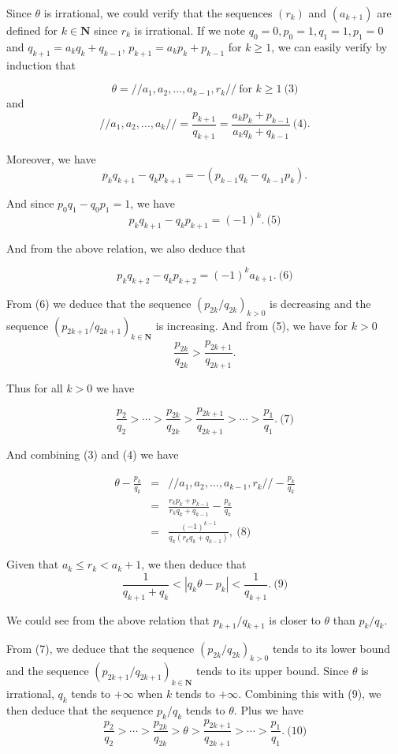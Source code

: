 \documentclass[a4paper,12pt]{article}
\begin{document}
Since $\theta$ is irrational, we could verify that the sequences
$(r_k)$ and $(a_{k+1})$ are defined for $k \in \textbf{N}$ since $r_k$
is irrational.  If we note $q_0 = 0, p_0 = 1, q_1 = 1, p_1 = 0$ and
$q_{k+1} = a_k q_k + q_{k-1}$, $p_{k+1} = a_k p_k + p_{k-1}$ for $k\ge
1$, we can easily verify by induction that

\[ \theta = //a_1,a_2,\ldots,a_{k-1},r_k //\ \mbox{for $k\ge 1$}\ \mbox{(3)}\]
and
\[ //a_1, a_2, \ldots, a_k // = \frac{p_{k+1}}{q_{k+1}} = \frac{a_k
  p_k + p_{k-1}}{a_k q_k + q_{k-1}}\ \mbox{(4)}.\]

Moreover, we have
\[p_k q_{k+1} - q_k p_{k+1} = - (p_{k-1}q_k - q_{k-1}p_k).\]

And since $p_0 q_1 - q_0 p_1 = 1$, we have
\[ p_k q_{k+1} - q_k p_{k+1} = (-1)^k.\ \mbox{(5)}\]

And from the above relation, we also deduce that

\[ p_kq_{k+2} - q_k p_{k+2} = (-1)^ka_{k+1}.\ \mbox{(6)}\]

From (6) we deduce that the sequence $(p_{2k}/q_{2k})_{k>0}$ is
decreasing and the sequence $(p_{2k+1}/q_{2k+1})_{k \in \textbf{N}}$ is
increasing.  And from (5), we have for $k>0$
\[ \frac{p_{2k}}{q_{2k}} > \frac{p_{2k+1}}{q_{2k+1}}.\]

Thus for all $k>0$ we have

\[ \frac{p_2}{q_2} > \cdots > \frac{p_{2k}}{q_{2k}} >
\frac{p_{2k+1}}{q_{2k+1}} > \cdots > \frac{p_1}{q_1}.\ \mbox{(7)}\]

And combining (3) and (4) we have

\begin{eqnarray*}
  \theta - \frac{p_k}{q_k} &=&
  //a_1, a_2,\ldots, a_{k-1}, r_k// - \frac{p_k}{q_k}\\ &=&
  \frac{r_k p_k + p_{k-1}}{r_k q_k + q_{k-1}} - \frac{p_k}{q_k} \\ &=&
  \frac{(-1)^{k-1}}{q_k(r_k q_k + q_{k-1})},\ \mbox{(8)}
\end{eqnarray*}

Given that $a_k \le r_k < a_k + 1$, we then deduce that
\[ \frac{1}{q_{k+1}+q_k}<|q_k\theta - p_k| < \frac{1}{q_{k+1}}.\ \mbox{(9)}\]

We could see from the above relation that $p_{k+1}/q_{k+1}$ is closer
to $\theta$ than $p_k/q_k$.

From (7), we deduce that the sequence $(p_{2k}/q_{2k})_{k>0}$ tends to
its lower bound and the sequence $(p_{2k+1}/q_{2k+1})_{k \in
  \textbf{N}}$ tends to its upper bound.  Since $\theta$ is
irrational, $q_k$ tends to $+\infty$ when $k$ tends to $+\infty$.
Combining this with (9), we then deduce that the sequence $p_k/q_k$
tends to $\theta$.  Plus we have
\[ \frac{p_2}{q_2} > \cdots > \frac{p_{2k}}{q_{2k}} > \theta >
\frac{p_{2k+1}}{q_{2k+1}} > \cdots > \frac{p_1}{q_1}.\ \mbox{(10)}\]
\end{document}

